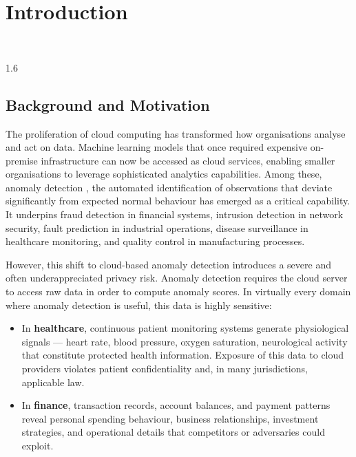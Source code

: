 \chapter{Introduction}
\HRule\\[2cm]
\label{Chapter1}

\begin{spacing}{1.6}

\section{Background and Motivation}

The proliferation of cloud computing has transformed how organisations analyse
and act on data. Machine learning models that once required expensive on-premise
infrastructure can now be accessed as cloud services, enabling smaller
organisations to leverage sophisticated analytics capabilities. Among these,
anomaly detection , the automated identification of observations that deviate
significantly from expected normal behaviour has emerged as a critical
capability. It underpins fraud detection in financial systems, intrusion
detection in network security, fault prediction in industrial operations, disease
surveillance in healthcare monitoring, and quality control in manufacturing
processes.

However, this shift to cloud-based anomaly detection introduces a severe and
often underappreciated privacy risk. Anomaly detection requires the cloud server
to access raw data in order to compute anomaly scores. In virtually every domain
where anomaly detection is useful, this data is highly sensitive:

\begin{itemize}
  \item In \textbf{healthcare}, continuous patient monitoring systems generate
  physiological signals --- heart rate, blood pressure, oxygen saturation,
  neurological activity that constitute protected health information. Exposure
  of this data to cloud providers violates patient confidentiality and, in many
  jurisdictions, applicable law.

  \item In \textbf{finance}, transaction records, account balances, and payment
  patterns reveal personal spending behaviour, business relationships, investment
  strategies, and operational details that competitors or adversaries could
  exploit.


\end{itemize}
\end{spacing}
